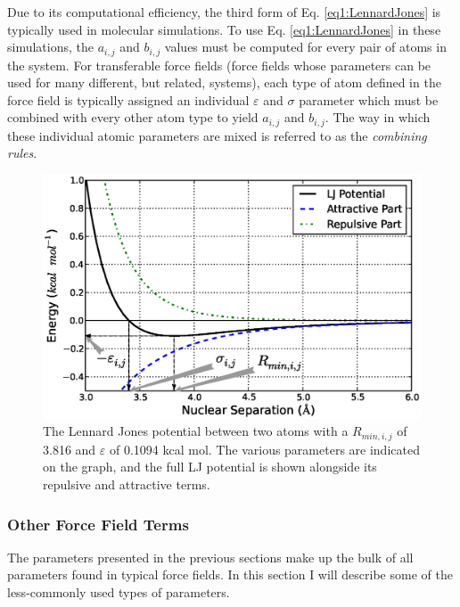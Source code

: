Due to its computational efficiency, the third form of Eq.
\ref{eq1:LennardJones} is typically used in molecular simulations. To use Eq.
\ref{eq1:LennardJones} in these simulations, the $a_{i,j}$ and $b_{i,j}$ values
must be computed for every pair of atoms in the system. For transferable force
fields (\ie force fields whose parameters can be used for many different, but
related, systems), each type of atom defined in the force field is typically
assigned an individual $\varepsilon$ and $\sigma$ parameter which must be
combined with every other atom type to yield $a_{i,j}$ and $b_{i,j}$. The way in
which these individual atomic parameters are mixed is referred to as the
\emph{combining rules}.

\begin{figure}
   \includegraphics[width=6.5in]{LennardJones.ps}
   \caption[The Lennard Jones potential between two atoms with a $R_{min,i,j}$
            of 3.816 \text{\AA} and $\varepsilon$ of 0.1094 kcal mol.]
           {The Lennard Jones potential between two atoms with a $R_{min,i,j}$
            of 3.816 \text{\AA} and $\varepsilon$ of 0.1094 kcal mol.
            The various parameters are indicated on the graph, and the full LJ
            potential is shown alongside its repulsive and attractive terms.}
   \label{fig1:LennardJones}
\end{figure}

\subsubsection{Other Force Field Terms}

The parameters presented in the previous sections make up the bulk of all
parameters found in typical force fields. In this section I will describe some
of the less-commonly used types of parameters.

